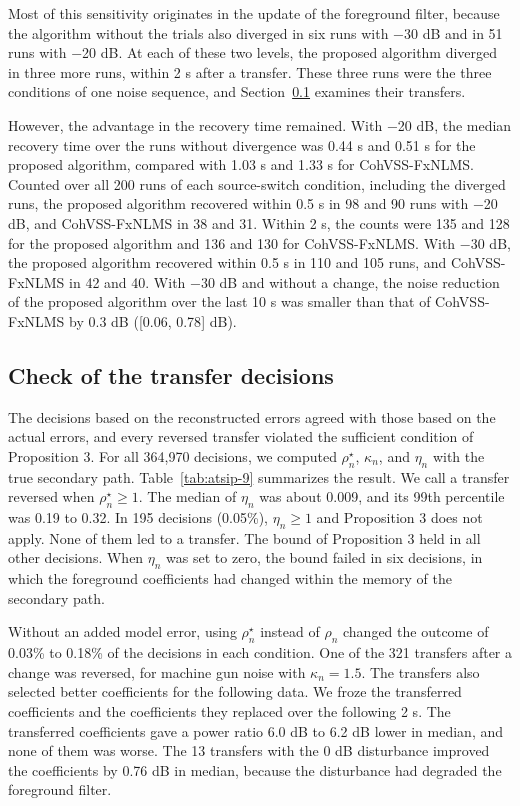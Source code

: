 \documentclass[sip,biber]{now-journal}
\begin{document}
Most of this sensitivity originates in the update of the foreground filter, because the algorithm without the trials also diverged in six runs with −30 dB and in 51 runs with −20 dB. At each of these two levels, the proposed algorithm diverged in three more runs, within 2 s after a transfer. These three runs were the three conditions of one noise sequence, and Section~\ref{sec:8.2} examines their transfers.

However, the advantage in the recovery time remained. With −20 dB, the median recovery time over the runs without divergence was 0.44 s and 0.51 s for the proposed algorithm, compared with 1.03 s and 1.33 s for CohVSS-FxNLMS. Counted over all 200 runs of each source-switch condition, including the diverged runs, the proposed algorithm recovered within 0.5 s in 98 and 90 runs with −20 dB, and CohVSS-FxNLMS in 38 and 31. Within 2 s, the counts were 135 and 128 for the proposed algorithm and 136 and 130 for CohVSS-FxNLMS. With −30 dB, the proposed algorithm recovered within 0.5 s in 110 and 105 runs, and CohVSS-FxNLMS in 42 and 40. With −30 dB and without a change, the noise reduction of the proposed algorithm over the last 10 s was smaller than that of CohVSS-FxNLMS by 0.3 dB ({[}0.06, 0.78{]} dB).

\hypertarget{sec:8.2}{%
\subsection{Check of the transfer decisions}\label{sec:8.2}}



The decisions based on the reconstructed errors agreed with those based on the actual errors, and every reversed transfer violated the sufficient condition of Proposition 3. For all 364,970 decisions, we computed \(\rho^{\star}_n\), \(\kappa_n\), and \(\eta_n\) with the true secondary path. Table~\ref{tab:atsip-9} summarizes the result. We call a transfer reversed when \(\rho^{\star}_n \ge 1\). The median of \(\eta_n\) was about 0.009, and its 99th percentile was 0.19 to 0.32. In 195 decisions (0.05\%), \(\eta_n \ge 1\) and Proposition 3 does not apply. None of them led to a transfer. The bound of Proposition 3 held in all other decisions. When \(\eta_n\) was set to zero, the bound failed in six decisions, in which the foreground coefficients had changed within the memory of the secondary path.

Without an added model error, using \(\rho^{\star}_n\) instead of \(\rho_n\) changed the outcome of 0.03\% to 0.18\% of the decisions in each condition. One of the 321 transfers after a change was reversed, for machine gun noise with \(\kappa_n = 1.5\). The transfers also selected better coefficients for the following data. We froze the transferred coefficients and the coefficients they replaced over the following 2 s. The transferred coefficients gave a power ratio 6.0 dB to 6.2 dB lower in median, and none of them was worse. The 13 transfers with the 0 dB disturbance improved the coefficients by 0.76 dB in median, because the disturbance had degraded the foreground filter.
\end{document}
